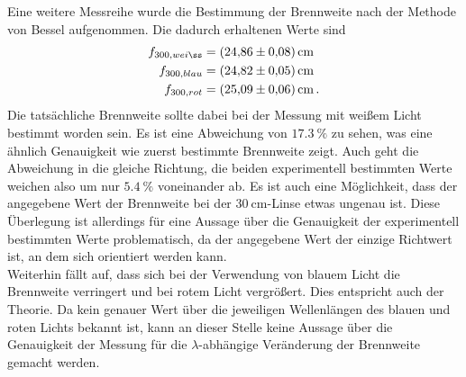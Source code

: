 Eine weitere Messreihe wurde die Bestimmung der Brennweite nach der Methode von Bessel aufgenommen.
Die dadurch erhaltenen Werte sind 
\begin{align*}
    f_{300,weiß} &= \SI{24.86+-0.08}{\centi\metre} \\
    f_{300,blau} &= \SI{24.82+-0.05}{\centi\metre} \\
    f_{300,rot} &= \SI{25.09+-0.06}{\centi\metre} \, .
\end{align*}
Die tatsächliche Brennweite sollte dabei bei der Messung mit weißem Licht bestimmt worden sein. Es ist eine Abweichung von 
$\SI{17.3}{\percent} $ zu sehen, was eine ähnlich Genauigkeit wie zuerst bestimmte Brennweite zeigt. Auch geht die Abweichung
in die gleiche Richtung, die beiden experimentell bestimmten Werte weichen also um nur $\SI{5.4}{\percent} $ voneinander ab. 
Es ist auch eine Möglichkeit, dass der angegebene Wert der Brennweite bei der $\SI{30}{\cm} $-Linse etwas ungenau ist. Diese 
Überlegung ist allerdings für eine Aussage über die Genauigkeit der experimentell bestimmten Werte problematisch, da der 
angegebene Wert der einzige Richtwert ist, an dem sich orientiert werden kann. \\

Weiterhin fällt auf, dass sich bei der Verwendung von blauem Licht die Brennweite verringert und bei rotem Licht vergrößert. 
Dies entspricht auch der Theorie. Da kein genauer Wert über die jeweiligen Wellenlängen des blauen und roten Lichts bekannt ist, 
kann an dieser Stelle keine Aussage über die Genauigkeit der Messung für die $\lambda$-abhängige Veränderung der Brennweite 
gemacht werden. 
